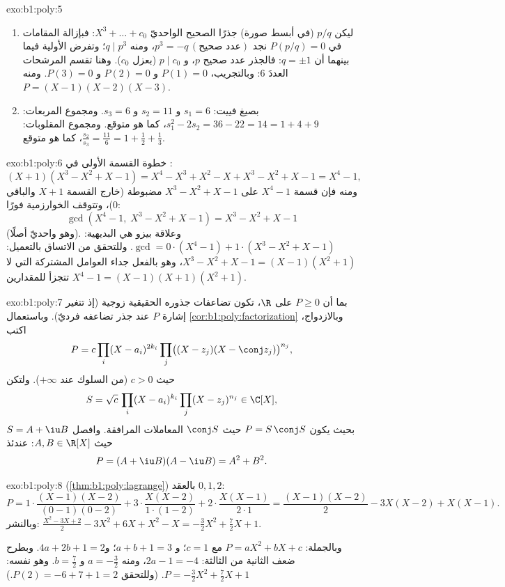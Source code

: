 \begin{solution}{exo:b1:poly:5}
\begin{enumerate}
  \item ليكن $p/q$ (في أبسط صورة) جذرًا  الصحيح
        الواحديّ $X^3 + \dots + c_0$: فبإزالة المقامات في
        $P(p/q) = 0$ نجد $p^3 = -q\,(\text{عدد صحيح})$، ومنه $q \mid
        p^3$؛ وتفرض الأولية فيما بينهما أن $q = \pm 1$: فالجذر عدد صحيح
        $p$، و $p \mid c_0$ (بعزل $c_0$). وهنا تقسم المرشحات
        العددَ $6$: وبالتجريب، $P(1) = 0$ و $P(2) = 0$ و $P(3) = 0$. ومنه
        $P = (X-1)(X-2)(X-3)$.
  \item بصيغ فييت: $s_1 = 6$ و $s_2 = 11$ و $s_3 = 6$. ومجموع المربعات:
        $s_1^2 - 2s_2 = 36 - 22 = 14 = 1 + 4 + 9$، كما هو متوقع. ومجموع المقلوبات:
        $\frac{s_2}{s_3} = \frac{11}{6} = 1 + \frac12 + \frac13$، كما هو متوقع.
\end{enumerate}
\end{solution}

\begin{solution}{exo:b1:poly:6}
خطوة القسمة الأولى في :
\[
(X + 1)(X^3 - X^2 + X - 1)
= X^4 - X^3 + X^2 - X + X^3 - X^2 + X - 1 = X^4 - 1 ,
\]
ومنه فإن قسمة $X^4 - 1$ على $X^3 - X^2 + X - 1$ مضبوطة
(خارج القسمة $X + 1$ والباقي $0$)، وتتوقف الخوارزمية فورًا:
\[
\gcd(X^4 - 1,\; X^3 - X^2 + X - 1) = X^3 - X^2 + X - 1
\]
(وهو واحديّ أصلًا). وعلاقة بيزو هي البديهية: $\gcd = 0
\cdot (X^4 - 1) + 1 \cdot (X^3 - X^2 + X - 1)$. وللتحقق من الاتساق
بالتعميل: $X^3 - X^2 + X - 1 = (X - 1)(X^2 + 1)$، وهو بالفعل
جداء العوامل المشتركة التي لا تتجزأ للمقدارين $X^4 - 1 =
(X-1)(X+1)(X^2+1)$.
\end{solution}

\begin{solution}{exo:b1:poly:7}
بما أن $P \geq 0$ على $\R$، تكون تضاعفات جذوره الحقيقية زوجية (إذ
تتغير إشارة $P$ عند جذر تضاعفه فرديّ). وباستعمال
\cref{cor:b1:poly:factorization} وبالازدواج، اكتب
\[
P = c \prod_i (X - a_i)^{2k_i} \prod_j \bigl((X - z_j)(X - \conj
z_j)\bigr)^{n_j},
\]
حيث $c > 0$ (من السلوك عند $+\infty$). ولتكن
\[
S = \sqrt c\, \prod_i (X - a_i)^{k_i} \prod_j (X - z_j)^{n_j}
\in \C[X],
\]
بحيث يكون $P = S\,\conj S$ حيث  $\conj S$ المعاملات
المرافقة. وافصل $S = A + \iu B$ حيث $A, B \in \R[X]$: عندئذ
\[
P = (A + \iu B)(A - \iu B) = A^2 + B^2 .
\]
\end{solution}

\begin{solution}{exo:b1:poly:8}
 (\cref{thm:b1:poly:lagrange}) بالعقد $0, 1, 2$:
\[
P = 1\cdot\frac{(X-1)(X-2)}{(0-1)(0-2)} + 3\cdot\frac{X(X-2)}{1\cdot(1-2)}
+ 2\cdot\frac{X(X-1)}{2\cdot 1}
= \frac{(X-1)(X-2)}{2} - 3X(X-2) + X(X-1).
\]
وبالنشر: $\frac{X^2 - 3X + 2}{2} - 3X^2 + 6X + X^2 - X =
-\frac{3}{2}X^2 + \frac{7}{2}X + 1$.

وبالجملة: $P = aX^2 + bX + c$ مع $c = 1$؛ و $a + b + 1 = 3$؛ و$4a + 2b +
1 = 2$. وبطرح ضعف الثانية من الثالثة: $2a - 1 = -4$،
ومنه $a = -\frac32$ و $b = \frac72$. وهو  نفسه:
$P = -\frac32 X^2 + \frac72 X + 1$. (وللتحقق $P(2) = -6 + 7 + 1 = 2$.)
\end{solution}

